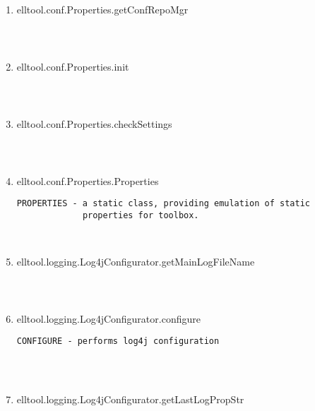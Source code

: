 \begin{enumerate}
\begin{lstlisting}
\end{lstlisting}
\fontfamily{\familydefault}
\selectfont
\item {elltool.conf.Properties.getConfRepoMgr}
\selectfont
\begin{lstlisting}



\end{lstlisting}
\fontfamily{\familydefault}
\selectfont
\item {elltool.conf.Properties.init}
\selectfont
\begin{lstlisting}



\end{lstlisting}
\fontfamily{\familydefault}
\selectfont
\item {elltool.conf.Properties.checkSettings}
\selectfont
\begin{lstlisting}



\end{lstlisting}
\fontfamily{\familydefault}
\selectfont
\item {elltool.conf.Properties.Properties}
\selectfont
\begin{lstlisting}
PROPERTIES - a static class, providing emulation of static
             properties for toolbox.



\end{lstlisting}
\fontfamily{\familydefault}
\selectfont
\item {elltool.logging.Log4jConfigurator.getMainLogFileName}
\selectfont
\begin{lstlisting}



\end{lstlisting}
\fontfamily{\familydefault}
\selectfont
\item {elltool.logging.Log4jConfigurator.configure}
\selectfont
\begin{lstlisting}
CONFIGURE - performs log4j configuration




\end{lstlisting}
\fontfamily{\familydefault}
\selectfont
\item {elltool.logging.Log4jConfigurator.getLastLogPropStr}
\selectfont
\begin{lstlisting}




\end{lstlisting}
\end{enumerate}
